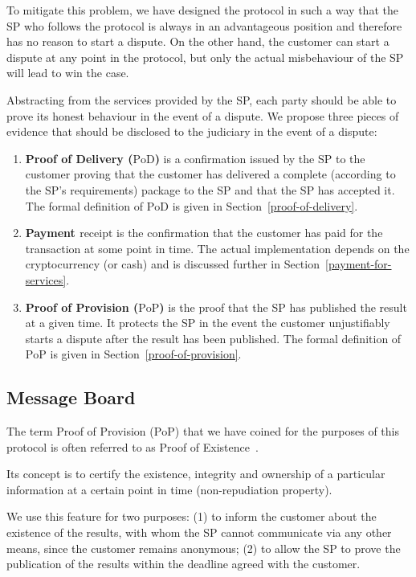 \documentclass[pdftex,twocolumn,epjc3]{svjour3}
\begin{document}
{To mitigate this problem, we have designed the protocol in such a way that the SP who follows the protocol is always in an advantageous position and therefore has no reason to start a dispute. On the other hand, the customer can start a dispute at any point in the protocol, but only the actual misbehaviour of the SP will lead to win the case.

Abstracting from the services provided by the SP, each party should be able to prove its honest behaviour in the event of a dispute. We propose three pieces of evidence that should be disclosed to the judiciary in the event of a dispute:

\begin{enumerate}
    \item \textbf{Proof of Delivery ($\textrm{PoD}$)} is a confirmation issued by the SP to the customer proving that the customer has delivered a complete (according to the SP's requirements) package to the SP and that the SP has accepted it. The formal definition of $\mathrm{PoD}$ is given in Section~\ref{proof-of-delivery}.
    
    \item \textbf{Payment $\textrm{receipt}$} is the confirmation that the customer has paid for the transaction at some point in time. The actual implementation depends on the cryptocurrency (or cash) and is discussed further in Section~\ref{payment-for-services}.
    
    \item \textbf{Proof of Provision ($\textrm{PoP}$)} is the proof that the SP has published the result at a given time. It protects the SP in the event the customer unjustifiably starts a dispute after the result has been published. The formal definition of $\mathrm{PoP}$ is given in Section~\ref{proof-of-provision}.
\end{enumerate}

\subsection{Message Board}\label{sec:message-board}
The term Proof of Provision ($\mathrm{PoP}$) that we have coined for the purposes of this protocol is often referred to as Proof of Existence~\cite{crespoStamperyBlockchainTimestamping2017}.

Its concept is to certify the existence, integrity and ownership of a particular information at a certain point in time (non-repudiation property).

We use this feature for two purposes: (1) to inform the customer about the existence of the results, with whom the SP cannot communicate via any other means, since the customer remains anonymous; (2) to allow the SP to prove the publication of the results within the deadline agreed with the customer.

}
\end{document}
